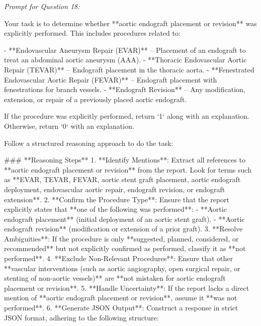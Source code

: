 \textit{\normalsize Prompt for Question  18:}
\begin{mdframed}[]
\normalsize

Your task is to determine whether **aortic endograft placement or revision** was explicitly performed. This includes procedures related to:  

- **Endovascular Aneurysm Repair (EVAR)** – Placement of an endograft to treat an abdominal aortic aneurysm (AAA).  
- **Thoracic Endovascular Aortic Repair (TEVAR)** – Endograft placement in the thoracic aorta.  
- **Fenestrated Endovascular Aortic Repair (FEVAR)** – Endograft placement with fenestrations for branch vessels.  
- **Endograft Revision** – Any modification, extension, or repair of a previously placed aortic endograft.  

If the procedure was explicitly performed, return `1` along with an explanation. Otherwise, return `0` with an explanation.

Follow a structured reasoning approach to do the task:

### **Reasoning Steps**  
1. **Identify Mentions**: Extract all references to **aortic endograft placement or revision** from the report. Look for terms such as **EVAR, TEVAR, FEVAR, aortic stent graft placement, aortic endograft deployment, endovascular aortic repair, endograft revision, or endograft extension**.  
2. **Confirm the Procedure Type**: Ensure that the report explicitly states that **one of the following was performed**:  
   - **Aortic endograft placement** (initial deployment of an aortic stent graft).  
   - **Aortic endograft revision** (modification or extension of a prior graft).  
3. **Resolve Ambiguities**: If the procedure is only **suggested, planned, considered, or recommended** but not explicitly confirmed as performed, classify it as **not performed**.  
4. **Exclude Non-Relevant Procedures**: Ensure that other **vascular interventions (such as aortic angiography, open surgical repair, or stenting of non-aortic vessels)** are **not mistaken for aortic endograft placement or revision**.  
5. **Handle Uncertainty**: If the report lacks a direct mention of **aortic endograft placement or revision**, assume it **was not performed**.  
6. **Generate JSON Output**: Construct a response in strict JSON format, adhering to the following structure:  

\end{mdframed}

